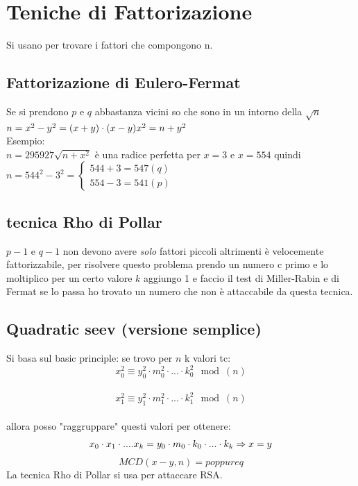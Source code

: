\documentclass[10pt,a4paper]{article}
\begin{document}
\section{Teniche di Fattorizazione}
Si usano per trovare i fattori che compongono n.
\subsection{Fattorizazione di Eulero-Fermat}
Se si prendono $p$ e $q$ abbastanza vicini so che sono in un intorno della $\sqrt{n}$
$n=x^2-y^2=(x+y)\cdot(x-y)\\x^2=n+y^2$\\
Esempio:\\
$n=295927 \sqrt{n+x^2}$ è una radice perfetta per $x=3$ e $x=554$ quindi
$n=544^2-3^2=\begin{cases}
544+3 = 547 (q)\\
554-3 = 541 (p)
\end{cases}
$
\subsection{tecnica Rho di Pollar}
$p-1$ e $q-1$ non devono avere \textit{solo} fattori piccoli altrimenti è velocemente fattorizzabile, per risolvere questo problema prendo un numero c primo e lo moltiplico per un certo valore $k$ aggiungo 1 e faccio il test di Miller-Rabin e di Fermat se lo passa ho trovato un numero che non è attaccabile da questa tecnica.
\subsection{Quadratic seev (versione semplice)}
Si basa sul basic principle: se trovo per $n$ k valori tc:\\
$$x_0^2\equiv y_0^2\cdot m_0^2 \cdot ... \cdot k_0^2 \mod(n)$$ \\
$$x_1^2\equiv y_1^2\cdot m_1^2 \cdot ... \cdot k_1^2 \mod(n)$$ \\
allora posso "raggruppare" questi valori per ottenere:
$$
x_0\cdot x_1 \cdot .... x_k = y_0 \cdot m_0 \cdot k_0 \cdot ... \cdot k_k\\
\Rightarrow \\
x = y\\
$$
$$MCD(x-y,n)=p oppure q
$$
La tecnica Rho di Pollar si usa per attaccare RSA.

\end{document}
